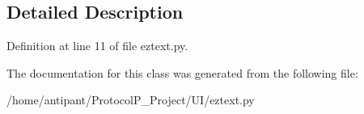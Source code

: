 \subsection{Detailed Description}


Definition at line 11 of file eztext.\-py.



The documentation for this class was generated from the following file\-:\begin{DoxyCompactItemize}
\item 
/home/antipant/\-Protocol\-P\-\_\-\-Project/\-U\-I/eztext.\-py\end{DoxyCompactItemize}
